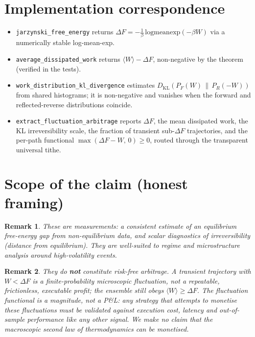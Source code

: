 \documentclass[11pt]{article}
\newtheorem{remark}{Remark}
\begin{document}
\section*{Implementation correspondence}

\begin{itemize}
\item \texttt{jarzynski\_free\_energy} returns
$\Delta F = -\tfrac1\beta\,\mathrm{logmeanexp}(-\beta W)$ via a numerically stable
log-mean-exp.
\item \texttt{average\_dissipated\_work} returns $\langle W\rangle - \Delta F$,
non-negative by the theorem (verified in the tests).
\item \texttt{work\_distribution\_kl\_divergence} estimates
$D_{\mathrm{KL}}(P_F(W)\,\|\,P_R(-W))$ from shared histograms; it is non-negative
and vanishes when the forward and reflected-reverse distributions coincide.
\item \texttt{extract\_fluctuation\_arbitrage} reports $\Delta F$, the mean
dissipated work, the KL irreversibility scale, the fraction of transient
sub-$\Delta F$ trajectories, and the per-path functional
$\max(\Delta F - W,\,0)\ge 0$, routed through the transparent universal tithe.
\end{itemize}

\section*{Scope of the claim (honest framing)}

\begin{remark}
These are \emph{measurements}: a consistent estimate of an equilibrium
free-energy gap from non-equilibrium data, and scalar diagnostics of
irreversibility (distance from equilibrium). They are well-suited to regime and
microstructure analysis around high-volatility events.
\end{remark}

\begin{remark}
They do \textbf{not} constitute risk-free arbitrage. A transient trajectory with
$W < \Delta F$ is a finite-probability microscopic fluctuation, not a repeatable,
frictionless, executable profit; the ensemble still obeys
$\langle W\rangle \ge \Delta F$. The fluctuation functional is a magnitude, not a
P\&L: any strategy that attempts to monetise these fluctuations must be validated
against execution cost, latency and out-of-sample performance like any other
signal. We make no claim that the macroscopic second law of thermodynamics can be
monetised.
\end{remark}
\end{document}
